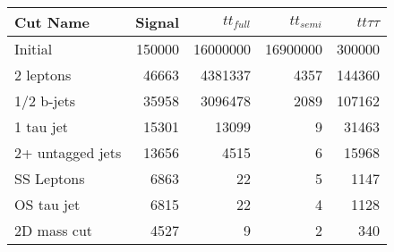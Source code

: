 \begin{tabular}{lrrrr}
\toprule
         Cut Name &  Signal &  $tt_{full}$ &  $tt_{semi}$ &  $tt\tau\tau$ \\
\midrule
          Initial &  150000 &     16000000 &     16900000 &        300000 \\
        2 leptons &   46663 &      4381337 &         4357 &        144360 \\
       1/2 b-jets &   35958 &      3096478 &         2089 &        107162 \\
        1 tau jet &   15301 &        13099 &            9 &         31463 \\
 2+ untagged jets &   13656 &         4515 &            6 &         15968 \\
       SS Leptons &    6863 &           22 &            5 &          1147 \\
       OS tau jet &    6815 &           22 &            4 &          1128 \\
      2D mass cut &    4527 &            9 &            2 &           340 \\
\bottomrule
\end{tabular}
